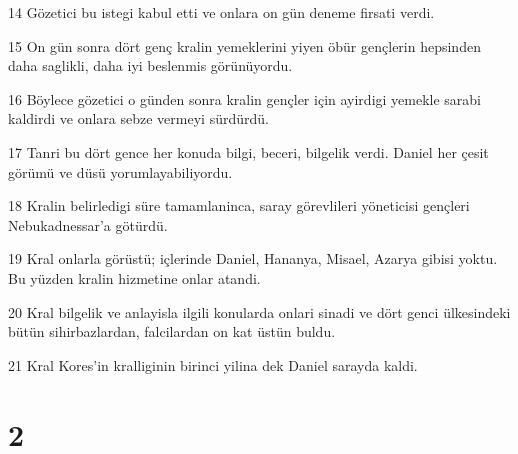 \par 14 Gözetici bu istegi kabul etti ve onlara on gün deneme firsati verdi.
\par 15 On gün sonra dört genç kralin yemeklerini yiyen öbür gençlerin hepsinden daha saglikli, daha iyi beslenmis görünüyordu.
\par 16 Böylece gözetici o günden sonra kralin gençler için ayirdigi yemekle sarabi kaldirdi ve onlara sebze vermeyi sürdürdü.
\par 17 Tanri bu dört gence her konuda bilgi, beceri, bilgelik verdi. Daniel her çesit görümü ve düsü yorumlayabiliyordu.
\par 18 Kralin belirledigi süre tamamlaninca, saray görevlileri yöneticisi gençleri Nebukadnessar'a götürdü.
\par 19 Kral onlarla görüstü; içlerinde Daniel, Hananya, Misael, Azarya gibisi yoktu. Bu yüzden kralin hizmetine onlar atandi.
\par 20 Kral bilgelik ve anlayisla ilgili konularda onlari sinadi ve dört genci ülkesindeki bütün sihirbazlardan, falcilardan on kat üstün buldu.
\par 21 Kral Kores'in kralliginin birinci yilina dek Daniel sarayda kaldi.

\chapter{2}

